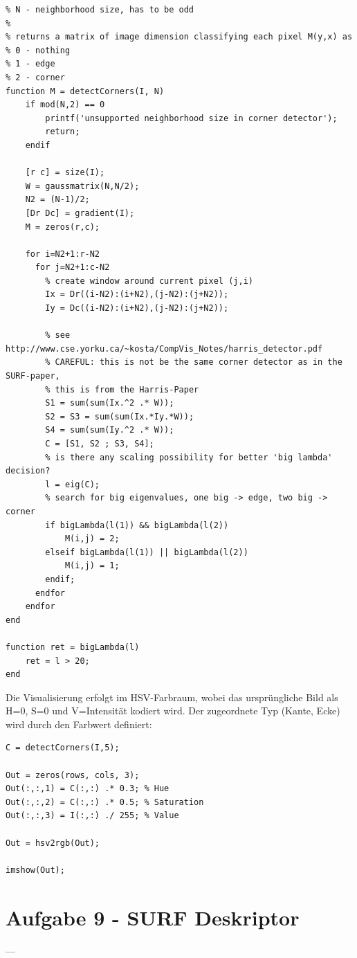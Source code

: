 \lstset{language=matlab}
\begin{lstlisting}[caption={Funktion f\"ur den Harris-Corner-Detector}]
% I - intensity image
% N - neighborhood size, has to be odd
% 
% returns a matrix of image dimension classifying each pixel M(y,x) as
% 0 - nothing
% 1 - edge
% 2 - corner
function M = detectCorners(I, N)
    if mod(N,2) == 0
        printf('unsupported neighborhood size in corner detector');
        return;
    endif
    
    [r c] = size(I);
    W = gaussmatrix(N,N/2);
    N2 = (N-1)/2;
    [Dr Dc] = gradient(I);
    M = zeros(r,c);
    
    for i=N2+1:r-N2
      for j=N2+1:c-N2
        % create window around current pixel (j,i)
        Ix = Dr((i-N2):(i+N2),(j-N2):(j+N2));
        Iy = Dc((i-N2):(i+N2),(j-N2):(j+N2));
    
        % see http://www.cse.yorku.ca/~kosta/CompVis_Notes/harris_detector.pdf
        % CAREFUL: this is not be the same corner detector as in the SURF-paper,
        % this is from the Harris-Paper
        S1 = sum(sum(Ix.^2 .* W));
        S2 = S3 = sum(sum(Ix.*Iy.*W)); 
        S4 = sum(sum(Iy.^2 .* W));
        C = [S1, S2 ; S3, S4];
        % is there any scaling possibility for better 'big lambda' decision?
        l = eig(C);
        % search for big eigenvalues, one big -> edge, two big -> corner 
        if bigLambda(l(1)) && bigLambda(l(2))
            M(i,j) = 2;
        elseif bigLambda(l(1)) || bigLambda(l(2))
            M(i,j) = 1;
        endif;
      endfor
    endfor
end

function ret = bigLambda(l)
    ret = l > 20;
end
\end{lstlisting}

Die Visualisierung erfolgt im HSV-Farbraum, wobei das urspr\"ungliche Bild
als H=0, S=0 und V=Intensit\"at kodiert wird. Der zugeordnete Typ (Kante, Ecke) wird
durch den Farbwert definiert:

\lstset{language=matlab}
\begin{lstlisting}[caption={Visualisierung der interessanten Punkte}]
C = detectCorners(I,5);

Out = zeros(rows, cols, 3);
Out(:,:,1) = C(:,:) .* 0.3; % Hue
Out(:,:,2) = C(:,:) .* 0.5; % Saturation
Out(:,:,3) = I(:,:) ./ 255; % Value

Out = hsv2rgb(Out);

imshow(Out);
\end{lstlisting}

\section*{Aufgabe 9 - SURF Deskriptor}

---


